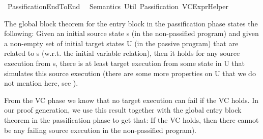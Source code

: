 %
\begin{isabellebody}%
%
%
\isadelimdocument
%
\endisadelimdocument
%
\isatagdocument
%
\isamarkuptrue%
%
\endisatagdocument
{\isafolddocument}%
%
\isadelimdocument
%
\endisadelimdocument
%
\isadelimtheory
%
\endisadelimtheory
%
\isatagtheory
{}\isamarkupfalse%
\ PassificationEndToEnd\isanewline
{}\ \ Semantics\ Util\ Passification\ VCExprHelper\isanewline
{}%
\endisatagtheory
{\isafoldtheory}%
%
\isadelimtheory
%
\endisadelimtheory
%
\isadelimdocument
%
\endisadelimdocument
%
\isatagdocument
%
\isamarkuptrue%
%
\endisatagdocument
{\isafolddocument}%
%
\isadelimdocument
%
\endisadelimdocument
%
\begin{isamarkuptext}%
The global block theorem for the entry block in the passification phase states the following:
Given an initial source state s (in the non-passified program) and given a non-empty set of initial target
states U (in the passive program) that are related to s (w.r.t. the initial variable relation), then
it holds for any source execution from s, there is at least target execution from some state in U
that simulates this source execution (there are some more properties on U that we do not mention here,
see ).

From the VC phase we know that no target execution can fail if the VC holds. In our proof generation, 
we use this result together with the global entry block theorem in the passification phase to get that:
If the VC holds, then there cannot be any failing source execution in the non-passified program).


\end{isamarkuptext}
\end{isabellebody}
